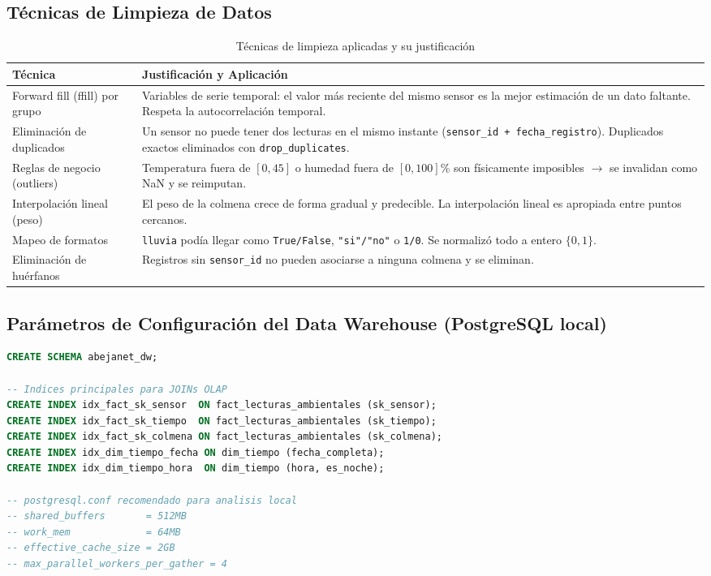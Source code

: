 \subsection{T\'ecnicas de Limpieza de Datos}

\begin{table}[h!]
  \centering
  \caption{T\'ecnicas de limpieza aplicadas y su justificaci\'on}
  \begin{tabularx}{\textwidth}{lX}
    \toprule
    \textbf{T\'ecnica} & \textbf{Justificaci\'on y Aplicaci\'on} \\
    \midrule
    Forward fill (ffill) por grupo & Variables de serie temporal: el valor m\'as reciente del mismo sensor es la mejor estimaci\'on de un dato faltante. Respeta la autocorrelaci\'on temporal. \\
    Eliminaci\'on de duplicados     & Un sensor no puede tener dos lecturas en el mismo instante (\texttt{sensor\_id + fecha\_registro}). Duplicados exactos eliminados con \texttt{drop\_duplicates}. \\
    Reglas de negocio (outliers)   & Temperatura fuera de $[0, 45]$\textcelsius{} o humedad fuera de $[0, 100]$\% son f\'isicamente imposibles $\rightarrow$ se invalidan como NaN y se reimputan. \\
    Interpolaci\'on lineal (peso)   & El peso de la colmena crece de forma gradual y predecible. La interpolaci\'on lineal es apropiada entre puntos cercanos. \\
    Mapeo de formatos               & \texttt{lluvia} pod\'ia llegar como \texttt{True/False}, \texttt{"si"/"no"} o \texttt{1/0}. Se normaliz\'o todo a entero $\{0, 1\}$. \\
    Eliminaci\'on de hu\'erfanos    & Registros sin \texttt{sensor\_id} no pueden asociarse a ninguna colmena y se eliminan. \\
    \bottomrule
  \end{tabularx}
\end{table}

\subsection{Par\'ametros de Configuraci\'on del Data Warehouse (PostgreSQL local)}

\begin{lstlisting}[language=SQL, caption=Esquema y \'indices de optimizaci\'on para el DW]
CREATE SCHEMA abejanet_dw;

-- Indices principales para JOINs OLAP
CREATE INDEX idx_fact_sk_sensor  ON fact_lecturas_ambientales (sk_sensor);
CREATE INDEX idx_fact_sk_tiempo  ON fact_lecturas_ambientales (sk_tiempo);
CREATE INDEX idx_fact_sk_colmena ON fact_lecturas_ambientales (sk_colmena);
CREATE INDEX idx_dim_tiempo_fecha ON dim_tiempo (fecha_completa);
CREATE INDEX idx_dim_tiempo_hora  ON dim_tiempo (hora, es_noche);

-- postgresql.conf recomendado para analisis local
-- shared_buffers       = 512MB
-- work_mem             = 64MB
-- effective_cache_size = 2GB
-- max_parallel_workers_per_gather = 4
\end{lstlisting}

